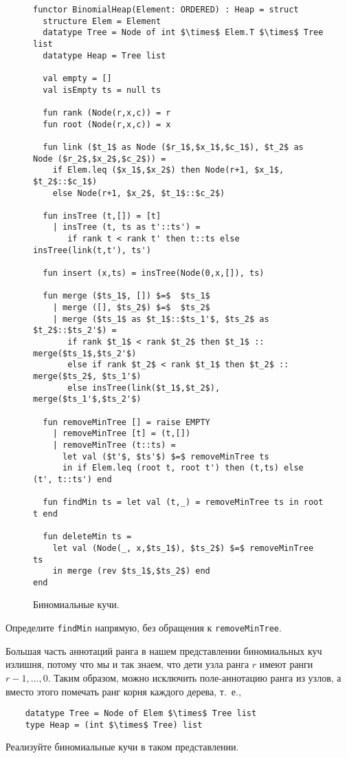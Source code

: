\begin{figure}
\begin{lstlisting}
functor BinomialHeap(Element: ORDERED) : Heap = struct
  structure Elem = Element
  datatype Tree = Node of int $\times$ Elem.T $\times$ Tree list
  datatype Heap = Tree list

  val empty = []
  val isEmpty ts = null ts

  fun rank (Node(r,x,c)) = r
  fun root (Node(r,x,c)) = x

  fun link ($t_1$ as Node ($r_1$,$x_1$,$c_1$), $t_2$ as Node ($r_2$,$x_2$,$c_2$)) =
    if Elem.leq ($x_1$,$x_2$) then Node(r+1, $x_1$, $t_2$::$c_1$)
    else Node(r+1, $x_2$, $t_1$::$c_2$)

  fun insTree (t,[]) = [t]
    | insTree (t, ts as t'::ts') =
       if rank t < rank t' then t::ts else insTree(link(t,t'), ts')

  fun insert (x,ts) = insTree(Node(0,x,[]), ts)

  fun merge ($ts_1$, []) $=$  $ts_1$
    | merge ([], $ts_2$) $=$  $ts_2$
    | merge ($ts_1$ as $t_1$::$ts_1'$, $ts_2$ as $t_2$::$ts_2'$) =
       if rank $t_1$ < rank $t_2$ then $t_1$ :: merge($ts_1$,$ts_2'$)
       else if rank $t_2$ < rank $t_1$ then $t_2$ :: merge($ts_2$, $ts_1'$)
       else insTree(link($t_1$,$t_2$), merge($ts_1'$,$ts_2'$)

  fun removeMinTree [] = raise EMPTY
    | removeMinTree [t] = (t,[])
    | removeMinTree (t::ts) =
      let val ($t'$, $ts'$) $=$ removeMinTree ts
      in if Elem.leq (root t, root t') then (t,ts) else (t', t::ts') end

  fun findMin ts = let val (t,_) = removeMinTree ts in root t end

  fun deleteMin ts =
    let val (Node(_, x,$ts_1$), $ts_2$) $=$ removeMinTree ts
    in merge (rev $ts_1$,$ts_2$) end
end
\end{lstlisting}
\centering

  \caption{Биномиальные кучи.}
  \label{fig:3.4}
\end{figure}

\begin{exercise}\label{ex:3.5}
  Определите \lstinline!findMin! напрямую, без обращения к \lstinline!removeMinTree!.
\end{exercise}

\begin{exercise}\label{ex:3.6}
  Большая часть аннотаций ранга в нашем представлении биномиальных куч
  излишня, потому что мы и так знаем, что дети узла ранга $r$ имеют
  ранги $r-1, \ldots, 0$. Таким образом, можно исключить
  поле-аннотацию ранга из узлов, а вместо этого помечать ранг корня
  каждого дерева, т.~е.,
  \begin{lstlisting}
    datatype Tree = Node of Elem $\times$ Tree list
    type Heap = (int $\times$ Tree) list
  \end{lstlisting}
  Реализуйте биномиальные кучи в таком представлении.
\end{exercise}

